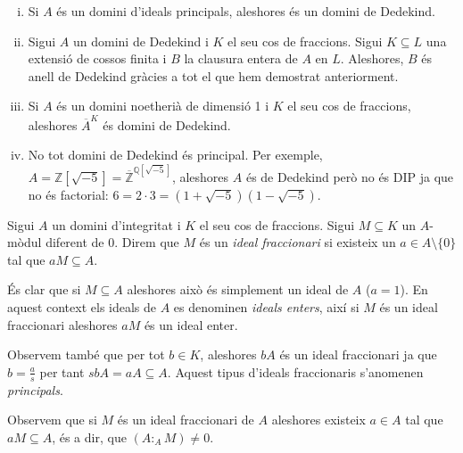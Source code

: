 \documentclass[../../../main.tex]{subfiles}
\begin{document}
\begin{ej}
\begin{enumerate}[(i)0]
    \item Si $A$ és un domini d'ideals principals, aleshores és un domini de Dedekind.
    \item Sigui $A$ un domini de Dedekind i $K$ el seu cos de fraccions. Sigui $K\subseteq L$ una extensió de cossos finita i $B$ la clausura entera de $A$ en $L$. Aleshores, $B$ és anell de Dedekind gràcies a tot el que hem demostrat anteriorment.
    \item Si $A$ és un domini noetherià de dimensió 1 i $K$ el seu cos de fraccions, aleshores $\overline{A}^K$ és domini de Dedekind.
    \item No tot domini de Dedekind és principal. Per exemple, $A = \mathbb{Z}[\sqrt{-5}] = \overline{\mathbb{Z}}^{\mathbb{Q}[\sqrt{-5}]}$, aleshores $A$ és de Dedekind però no és DIP ja que no és factorial: $6 = 2\cdotp 3 = (1+\sqrt{-5})(1-\sqrt{-5})$.
\end{enumerate}
\end{ej}

\begin{defi}
\label{def:idealFraccionari} Sigui $A$ un domini d'integritat i $K$ el seu cos de fraccions. Sigui $M\subseteq K$ un $A$-mòdul diferent de 0. Direm que $M$ és un \textit{ideal fraccionari} si existeix un $a\in A\setminus\{0\}$ tal que $aM\subseteq A$. 
\end{defi}

\begin{defi}
És clar que si $M\subseteq A$ aleshores això és simplement un ideal de $A$ ($a=1$). En aquest context els ideals de $A$ es denominen \textit{ideals enters}\label{def:idealEnter}, així si $M$ és un ideal fraccionari aleshores $aM$ és un ideal enter.
\end{defi}



\begin{defi}
\label{def:idealFraccionariPrincipal} Observem també que per tot $b\in K$, aleshores $bA$ és un ideal fraccionari ja que $b = \frac{a}{s}$ per tant $sbA = aA\subseteq A$. Aquest tipus d'ideals fraccionaris s'anomenen \textit{principals}.
\end{defi}

Observem que si $M$ és un ideal fraccionari de $A$ aleshores existeix $a\in A$ tal que $aM\subseteq A$, és a dir, que $(A:_AM)\neq 0$.
\end{document}
